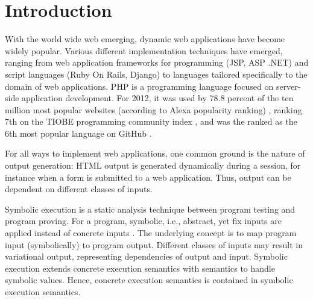 \documentclass[preprint]{sig-alternate-05-2015}
\begin{document}



%
%
\printccsdesc



\section{Introduction}
With the world wide web emerging, dynamic web applications have become widely popular. Various different implementation techniques have emerged, ranging from web application frameworks for programming (JSP, ASP .NET) and script languages (Ruby On Rails, Django) to languages tailored specifically to the domain of web applications. PHP \cite{phpNET} is a programming language focused on server-side application development. For 2012, it was used by 78.8 percent of the ten million most popular websites (according to Alexa popularity ranking) \cite{alexaPHP}, ranking 7th on the TIOBE programming community index \cite{tiobePHP}, and was the ranked as the 6th most popular language on GitHub \cite{githubPHP}.

For all ways to implement web applications, one common ground is the nature of output generation: HTML output is generated dynamically during a session, for instance when a form is submitted to a web application. Thus, output can be dependent on different classes of inputs.

Symbolic execution is a static analysis technique between program testing and program proving. For a program, symbolic, i.e., abstract, yet fix inputs are applied instead of  concrete inputs \cite{Darringer1978,King1976}. The underlying concept is to map program input (symbolically) to program output.  Different classes of inputs may result in variational output, representing  dependencies of output and input. Symbolic execution extends concrete execution semantics with semantics to handle symbolic values. Hence, concrete execution semantics is contained in symbolic execution semantics. 
\end{document}
